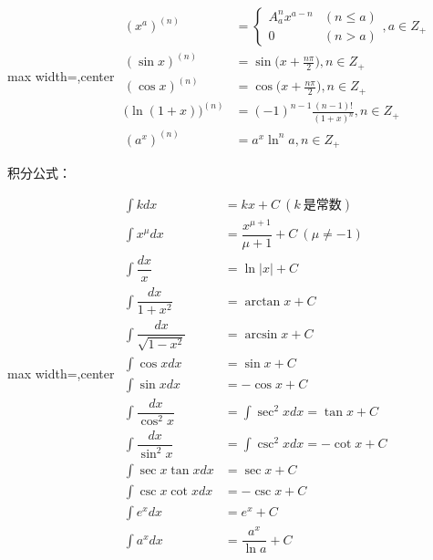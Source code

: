 \documentclass[twocolumn,10pt]{ctexart}
\begin{document}
\begin{adjustbox}{max width=\linewidth,center}
$\begin{aligned}
(x^a)^{(n)}&=\begin{cases}A_a^nx^{a-n}&(n\le a)\\0&(n>a)\end{cases},a\in Z_+\\
(\sin x)^{(n)}&=\sin\bigl(x+\frac {n\pi}2\bigr),n\in Z_+\\
(\cos x)^{(n)}&=\cos\bigl(x+\frac {n\pi}2\bigr),n\in Z_+\\
\bigl(\ln(1+x)\bigr)^{(n)}&=(-1)^{n-1}\frac{(n-1)!}{(1+x)^n},n\in Z_+\\
(a^x)^{(n)}&=a^x\ln^na,n\in Z_+
\end{aligned}$
\end{adjustbox}

积分公式：

\begin{adjustbox}{max width=\linewidth,center}
$\begin{aligned}
\int kdx&=kx+C\ (k\ \text{是常数})\\
\int x^\mu dx&=\dfrac{x^{\mu+1}}{\mu+1}+C\ (\mu\neq -1)\\
\int\dfrac{dx}x&=\ln |x|+C\\
\int\dfrac{dx}{1+x^2}&=\arctan x+C\\
\int\dfrac{dx}{\sqrt{1-x^2}}&=\arcsin x+C\\
\int\cos xdx&=\sin x+C\\
\int\sin xdx&=-\cos x+C\\
\int\dfrac{dx}{\cos^2x}&=\int\sec^2 xdx=\tan x+C\\
\int\dfrac{dx}{\sin^2x}&=\int\csc^2 xdx=-\cot x+C\\
\int\sec x\tan xdx&=\sec x+C\\
\int\csc x\cot xdx&=-\csc x+C\\
\int e^xdx&=e^x+C\\
\int a^xdx&=\dfrac{a^x}{\ln a}+C
\end{aligned}$
\end{adjustbox}
\end{document}
